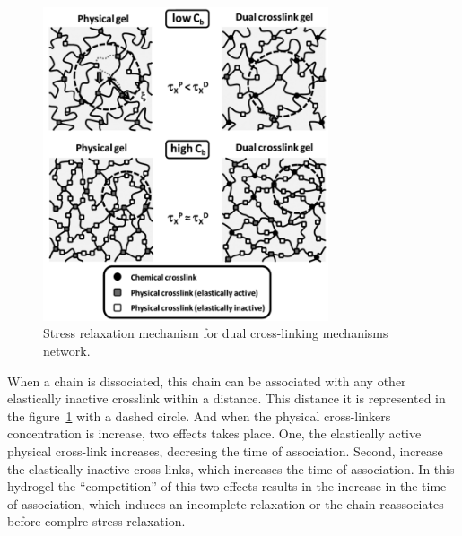 \begin{figure}[ht!]
    \centering
    \includegraphics[width=0.75\textwidth]{figs/explainMechResponse/dualNetwork1.png}
    \caption{Stress relaxation mechanism for dual cross-linking mechanisms network\citep{naritaViscoelasticPropertiesPolyvinyl2013}.}\label{fig:hydroMechResponse1}
\end{figure}

When a chain is dissociated, this chain can be associated with any other elastically inactive crosslink within a distance.
This distance it is represented in the figure~\ref{fig:hydroMechResponse1} with a dashed circle.
And when the physical cross-linkers concentration is increase, two effects takes place.
One, the elastically active physical cross-link increases, decresing the time of association.
Second, increase the elastically inactive cross-links, which increases the time of association.
In this hydrogel the ``competition'' of this two effects results in the increase in the time of association, which induces an incomplete relaxation or the chain reassociates before complre stress relaxation.


